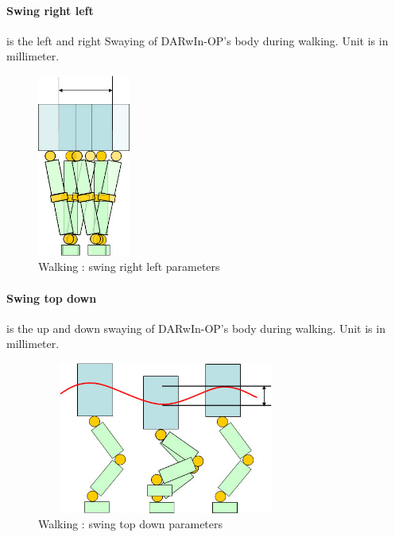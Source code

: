 \documentclass[a4paper, 12pt]{article}  		%
\begin{document}
\paragraph*{Swing right left}
is the left and right Swaying of DARwIn-OP's body during walking. Unit is in millimeter.
\begin{figure}[H]
\begin{center}
\includegraphics[height=6cm]{swing_right_left.jpg}
\caption{Walking : swing right left parameters}
\label{swing_right_left}
\end{center}
\end{figure}

\paragraph*{Swing top down}
is the up and down swaying of DARwIn-OP's body during walking. Unit is in millimeter.
\begin{figure}[H]
\begin{center}
\includegraphics[height=5cm, width=8.5cm]{swing_top_down.jpg}
\caption{Walking : swing top down parameters}
\label{swing_top_down}
\end{center}
\end{figure}
\end{document}
